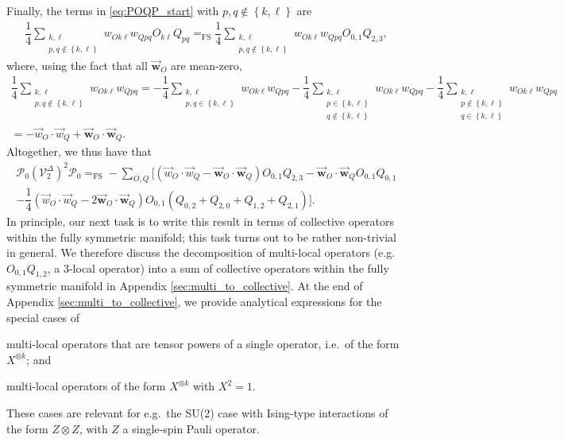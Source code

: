 \documentclass[nofootinbib,notitlepage,11pt]{revtex4-2}
\newcommand{\f}[2]{\dfrac{#1}{#2}} %
\newcommand{\p}[1]{\left(#1\right)} %
\renewcommand{\set}[1]{\left\{#1\right\}} %
\renewcommand{\c}{\cdot} %
\newcommand{\m}{\bm} %
\renewcommand{\v}{\vec} %
\newcommand{\1}{\mathds{1}}
\renewcommand{\P}{\mathcal{P}}
\newcommand{\V}{\mathcal{V}}
\newcommand{\EQFS}{=_{\text{FS}}}
\begin{document}
Finally, the terms in \eqref{eq:POQP_start} with
$p,q\notin\set{k,\ell}$ are
\begin{align}
  \f14 \sum_{\substack{k,\ell\\p,q\notin\set{k,\ell}}}
  w_{Ok\ell} w_{Qpq} O_{k\ell} Q_{pq}
  \EQFS \f14 \sum_{\substack{k,\ell\\p,q\notin\set{k,\ell}}}
  w_{Ok\ell} w_{Qpq} O_{0,1} Q_{2,3},
\end{align}
where, using the fact that all $\v{\m w}_O$ are mean-zero,
\begin{multline}
  \f14 \sum_{\substack{k,\ell\\p,q\notin\set{k,\ell}}} w_{Ok\ell} w_{Qpq}
  = - \f14 \sum_{\substack{k,\ell\\p,q\in\set{k,\ell}}} w_{Ok\ell} w_{Qpq}
  - \f14 \sum_{\substack{k,\ell\\p\in\set{k,\ell}\\q\notin\set{k,\ell}}}
  w_{Ok\ell} w_{Qpq}
  - \f14 \sum_{\substack{k,\ell\\p\notin\set{k,\ell}\\q\in\set{k,\ell}}}
  w_{Ok\ell} w_{Qpq} \\
  = -\v w_O \c \v w_Q + \v{\m w}_O \c \v{\m w}_Q.
\end{multline}
Altogether, we thus have that
\begin{multline}
  \P_0 \p{\V_2^\Delta}^2 \P_0
  \EQFS - \sum_{O,Q} \bigg[
  \p{\v w_O \c \v w_Q - \v{\m w}_O \c \v{\m w}_Q} O_{0,1} Q_{2,3}
  - \v{\m w}_O \c \v{\m w}_Q O_{0,1} Q_{0,1} \\
  -\f14 \p{\v w_O\c\v w_Q - 2 \v{\m w}_O \c \v{\m w}_Q}
  O_{0,1} \p{Q_{0,2} + Q_{2,0} + Q_{1,2} + Q_{2,1}} \bigg].
  \label{eq:POQP}
\end{multline}
In principle, our next task is to write this result in terms of
collective operators within the fully symmetric manifold; this task
turns out to be rather non-trivial in general.  We therefore discuss
the decomposition of multi-local operators (e.g.~$O_{0,1} Q_{1,2}$, a
3-local operator) into a sum of collective operators within the fully
symmetric manifold in Appendix \ref{sec:multi_to_collective}.  At the
end of Appendix \ref{sec:multi_to_collective}, we provide analytical
expressions for the special cases of
\begin{enumerate*}
\item multi-local operators that are tensor powers of a single
  operator, i.e.~of the form $X^{\otimes k}$; and
\item multi-local operators of the form $X^{\otimes k}$ with $X^2=1$.
\end{enumerate*}
These cases are relevant for e.g.~the SU(2) case with Ising-type
interactions of the form $Z\otimes Z$, with $Z$ a single-spin Pauli
operator.
\end{document}
